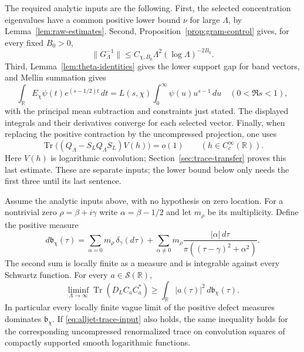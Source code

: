 The required analytic inputs are the following.
First, the selected concentration eigenvalues have a common positive
lower bound $\nu$ for large $\Lambda$, by Lemma~\ref{lem:raw-estimates}.
Second, Proposition~\ref{prop:gram-control} gives, for every fixed $B_0>0$,
\begin{equation}\label{eq:alljet-gram-input}
 \|G_\Lambda^{-1}\|\leq
 C_{\chi,B_0}\Lambda^2(\log\Lambda)^{-2B_0}.
\end{equation}
Third, Lemma~\ref{lem:theta-identities} gives the lower support gap for band
vectors, and Mellin summation gives
\[
 \int_{\mathbb R}E_\chi\psi(t)e^{(s-1/2)t}\,dt
 =L(s,\chi)\int_0^\infty\psi(u)u^{s-1}\,du
 \quad(0<\Re s<1),
\]
with the principal mean subtraction and constraints just stated.
The displayed integrals and their derivatives converge for each selected
vector.  Finally, when replacing the positive contraction by the
uncompressed projection, one uses
\begin{equation}\label{eq:alljet-trace-input}
 \operatorname{Tr}\bigl((Q_\Lambda-S_LQ_\Lambda S_L)V(h)\bigr)=o(1)
 \qquad(h\in C_c^\infty(\mathbb R)).
\end{equation}
Here $V(h)$ is logarithmic convolution; Section~\ref{sec:trace-transfer}
proves this last estimate. These are separate inputs;
the lower bound below only needs the first three until its last sentence.

\begin{theorem}\label{thm:allzero-lower}
Assume the analytic inputs above, with no hypothesis on zero location.
For a nontrivial zero $\rho=\beta+i\gamma$ write
$\alpha=\beta-1/2$ and let $m_\rho$ be its multiplicity.
Define the positive measure
\[
 d\mathfrak b_\chi(\tau)=
 \sum_{\alpha=0}m_\rho\,\delta_\gamma(d\tau)
 +\sum_{\alpha\ne0}m_\rho
 \frac{|\alpha|\,d\tau}{\pi((\tau-\gamma)^2+\alpha^2)}.
\]
The second sum is locally finite as a measure and is integrable against
every Schwartz function.  For every $a\in\mathcal S(\mathbb R)$,
\begin{equation}\label{eq:allzero-lower}
 \liminf_{\Lambda\to\infty}\operatorname{Tr}(D_LC_aC_a^*)
 \geq\int_{\mathbb R}|a(\tau)|^2\,d\mathfrak b_\chi(\tau).
\end{equation}
In particular every locally finite vague limit of the positive defect
measures dominates $\mathfrak b_\chi$.
If \eqref{eq:alljet-trace-input} also holds, the same inequality holds
for the corresponding uncompressed renormalized trace on convolution
squares of compactly supported smooth logarithmic functions.
\end{theorem}

